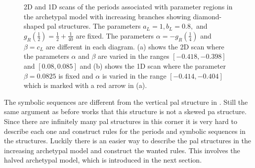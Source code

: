 \begin{figure}
	\centering
	\caption[2D and 1D scans of the periods associated with parameter regions in the archetypal model with increasing branches showing diamond-shaped period-adding-like structures]{
		2D and 1D scans of the periods associated with parameter regions in the archetypal model with increasing branches showing diamond-shaped \gls{pal} structures.
		The parameters $a_L = 1, b_L = 0.8,$ and $g_R\left(\frac{1}{2}\right) = \frac{1}{2} + \frac{1}{40}$ are fixed.
		The parameters $\alpha = -g_R\left(\frac{1}{4}\right)$ and $\beta = c_L$ are different in each diagram.
		(a) shows the 2D scan where the parameters $\alpha$ and $\beta$ are varied in the ranges $[-0.418, -0.398]$ and $[0.08, 0.085]$
		and (b) shows the 1D scan where the parameter $\beta = 0.0825$ is fixed and $\alpha$ is varied in the range $[-0.414, -0.404]$ which is marked with a red arrow in (a).
	}
	\label{fig:add.add.like.corn}
\end{figure}

The symbolic sequences are different from the vertical \gls{pal} structure in .
Still the same argument as before works that this structure is not a skewed \gls{pa} structure.
Since there are infinitely many \gls{pal} structures in this corner it is very hard to describe each one and construct rules for the periods and symbolic sequences in the structures.
Luckily there is an easier way to describe the \gls{pal} structures in the increasing archetypal model and construct the wanted rules.
This involves the halved archetypal model, which is introduced in the next section.

